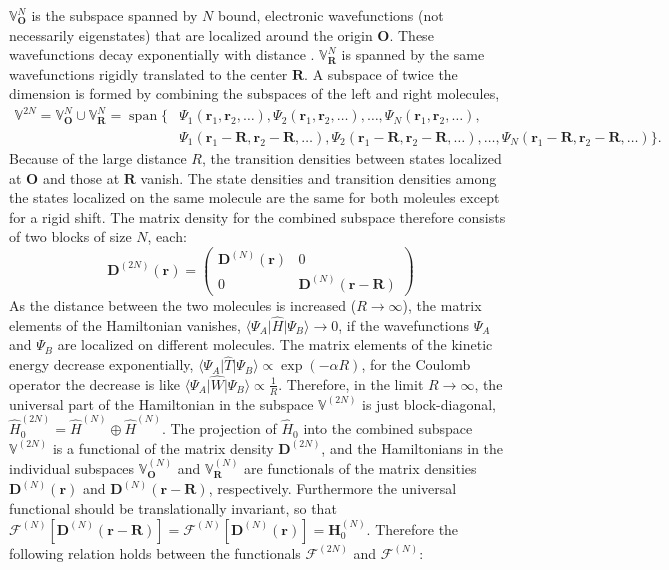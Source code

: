 \documentclass[journal=jpclcd,manuscript=letter]{achemso}
\DeclareMathOperator{\Span}{span}
\newcommand\m[1]{\mathbf{#1}}
\renewcommand\vec[1]{\mathbf{#1}}
\begin{document}
$\mathbb{V}_{\vec{O}}^N$ is the subspace spanned by $N$ bound, electronic wavefunctions (not necessarily eigenstates) that are localized around the origin $\vec{O}$.
These wavefunctions decay exponentially with distance \cite{Katriel1980asymptotic}. $\mathbb{V}_{\vec{R}}^N$ is spanned by the same wavefunctions rigidly translated to the center $\vec{R}$. A subspace of twice the dimension is formed by combining the subspaces of the left and right molecules,
\begin{equation}
  \begin{split}
    \mathbb{V}^{2N} = \mathbb{V}^{N}_{\vec{O}} \cup \mathbb{V}^{N}_{\vec{R}} = \Span\Big\{ &
                  \Psi_1(\vec{r}_1,\vec{r}_2,\ldots),
                  \Psi_2(\vec{r}_1,\vec{r}_2,\ldots), \ldots,
                  \Psi_N(\vec{r}_1,\vec{r}_2,\ldots), \\
    &             \Psi_1(\vec{r}_1-\vec{R},\vec{r}_2-\vec{R},\ldots),
                  \Psi_2(\vec{r}_1-\vec{R},\vec{r}_2-\vec{R},\ldots), \ldots,
                  \Psi_N(\vec{r}_1-\vec{R},\vec{r}_2-\vec{R},\ldots) \Big\}.
  \end{split}
\end{equation}
Because of the large distance $R$, the transition densities between states localized at $\vec{O}$ and those at $\vec{R}$ vanish. The state densities and transition densities among the states localized on the same molecule are the same for both moleules except for a rigid shift. The matrix density for the combined subspace therefore consists of two blocks of size $N$, each:
\begin{equation}
  \m{D}^{(2N)}(\vec{r}) =
  \begin{pmatrix}
    \m{D}^{(N)}(\vec{r}) & 0 \\
    0 & \m{D}^{(N)}(\vec{r}-\vec{R})
  \end{pmatrix}
\end{equation}
As the distance between the two molecules is increased ($R \to \infty$), the matrix elements of the Hamiltonian vanishes, $\langle \Psi_{A} \vert \hat{H} \vert \Psi_{B} \rangle \to 0$, if the wavefunctions $\Psi_A$ and $\Psi_B$ are localized on different molecules. The matrix elements of the kinetic energy decrease exponentially, $\langle \Psi_{A} \vert \hat{T} \vert \Psi_{B} \rangle \propto \exp(-\alpha R)$, for the Coulomb operator the decrease is like $\langle \Psi_{A} \vert \hat{W} \vert \Psi_{B} \rangle \propto \frac{1}{R}$.
Therefore, in the limit $R \to \infty$, the universal part of the Hamiltonian in the subspace $\mathbb{V}^{(2 N)}$ is just block-diagonal, $\hat{H}^{(2N)}_0 = \hat{H}^{(N)} \oplus \hat{H}^{(N)}$. The projection of $\hat{H}_0$ into the combined subspace $\mathbb{V}^{(2N)}$ is a functional of the matrix density $\m{D}^{(2N)}$, and the Hamiltonians in the individual subspaces $\mathbb{V}^{(N)}_{\vec{O}}$ and $\mathbb{V}^{(N)}_{\vec{R}}$ are functionals of the matrix densities $\m{D}^{(N)}(\vec{r})$ and $\m{D}^{(N)}(\vec{r}-\vec{R})$, respectively. Furthermore the universal functional should be translationally invariant, so that $\mathcal{F}^{(N)}[\m{D}^{(N)}(\vec{r}-\vec{R})] = \mathcal{F}^{(N)}[\m{D}^{(N)}(\vec{r})] = \m{H}^{(N)}_0$. Therefore the following relation holds between the functionals $\mathcal{F}^{(2N)}$ and $\mathcal{F}^{(N)}$:
\end{document}
